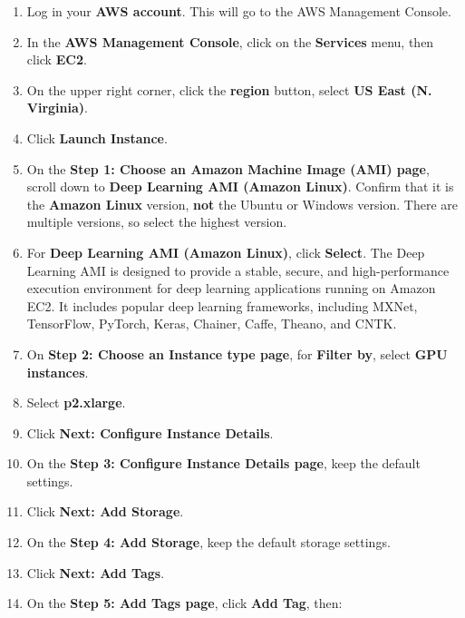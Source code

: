 \documentclass[]{book}
\providecommand{\tightlist}{%
  \setlength{\itemsep}{0pt}\setlength{\parskip}{0pt}}
\begin{document}
\begin{enumerate}
\def\labelenumi{\arabic{enumi}.}
\setcounter{enumi}{11}
\tightlist
\item
  Log in your \textbf{AWS account}. This will go to the AWS Management Console.
\item
  In the \textbf{AWS Management Console}, click on the \textbf{Services} menu, then click \textbf{EC2}.
\item
  On the upper right corner, click the \textbf{region} button, select \textbf{US East (N. Virginia)}.
\item
  Click \textbf{Launch Instance}.
\item
  On the \textbf{Step 1: Choose an Amazon Machine Image (AMI) page}, scroll down to \textbf{Deep Learning AMI (Amazon Linux)}.
  Confirm that it is the \textbf{Amazon Linux} version, \textbf{not} the Ubuntu or Windows version. There are multiple versions, so select the highest version.
\item
  For \textbf{Deep Learning AMI (Amazon Linux)}, click \textbf{Select}.
  The Deep Learning AMI is designed to provide a stable, secure, and high-performance execution environment for deep learning applications running on Amazon EC2. It includes popular deep learning frameworks, including MXNet, TensorFlow, PyTorch, Keras, Chainer, Caffe, Theano, and CNTK.
\item
  On \textbf{Step 2: Choose an Instance type page}, for \textbf{Filter by}, select \textbf{GPU instances}.
\item
  Select \textbf{p2.xlarge}.
\item
  Click \textbf{Next: Configure Instance Details}.
\item
  On the \textbf{Step 3: Configure Instance Details page}, keep the default settings.
\item
  Click \textbf{Next: Add Storage}.
\item
  On the \textbf{Step 4: Add Storage}, keep the default storage settings.
\item
  Click \textbf{Next: Add Tags}.
\item
  On the \textbf{Step 5: Add Tags page}, click \textbf{Add Tag}, then:


\end{enumerate}
\end{document}
